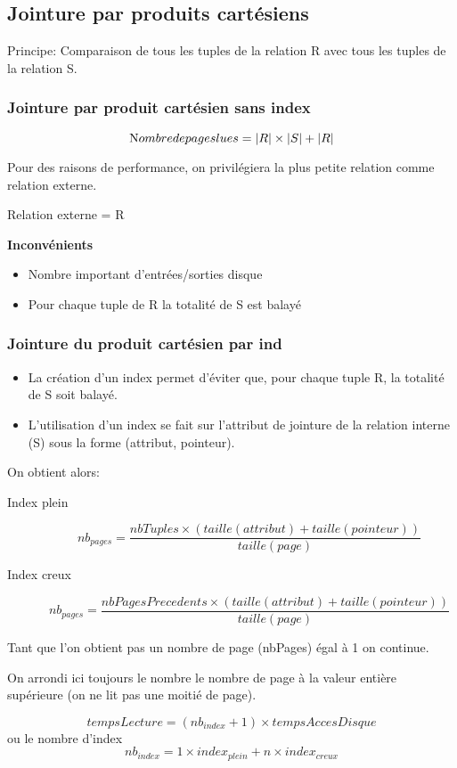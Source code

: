 \documentclass[12pt,a4paper,openany]{book}
\begin{document}
\subsection{Jointure par produits cartésiens}
Principe: Comparaison de tous les tuples de la relation R avec tous les tuples de la relation S.

\subsubsection{Jointure par produit cartésien sans index}
$$\textrm Nombre de pages lues = |R| \times |S| + |R|$$
\begin{remarque}
	 Pour des raisons de performance, on privilégiera la plus petite relation comme relation externe.

	 Relation externe = R
\end{remarque}
\begin{attention}
	\textbf{Inconvénients}
	\begin{itemize}
		\item Nombre important d'entrées/sorties disque
		\item Pour chaque tuple de R la totalité de S est balayé
	\end{itemize}
\end{attention}

\subsubsection{Jointure du produit cartésien par ind}
\begin{itemize}
	\item La création d'un index permet d'éviter que, pour chaque tuple R, la totalité de S soit balayé. 
	\item L'utilisation d'un index se fait sur l'attribut de jointure de la relation interne (S) sous la forme (attribut, pointeur). 
\end{itemize}
On obtient alors: 
\begin{description}
	\item[Index plein] $$nb_{pages} = \frac{nbTuples \times (taille(attribut) + taille(pointeur))}{taille(page)}$$
	\item[Index creux] $$nb_{pages} = \frac{nbPagesPrecedents \times (taille(attribut) + taille(pointeur))}{taille(page)}$$
\end{description}
Tant que l'on obtient pas un nombre de page (nbPages) égal à 1 on continue.  

\begin{remarque}
	 On arrondi ici toujours le nombre le nombre de page à la valeur entière supérieure (on ne lit pas une moitié de page).
\end{remarque}
$$tempsLecture = (nb_{index}+1) \times tempsAccesDisque$$ 
ou le nombre d'index
$$nb_{index} = 1 \times index_{plein} + n \times index_{creux}$$
\end{document}
